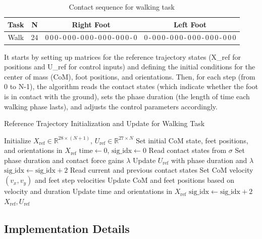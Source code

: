 \documentclass[main.tex]{subfiles}
\begin{document}
\begin{table}[H]
\centering
\caption{Contact sequence for walking task}
\label{tab:cs_walk}
\begin{tabular}{|c|c|c|c|}
\hline
\textbf{Task} & \textbf{N} & \textbf{Right Foot} & \textbf{Left Foot} \\
\hline
Walk & 24 & 0\,0\,0\,-\,0\,0\,0\,-\,0\,0\,0\,-\,0\,0\,0\,-\,0\,0\,0\,-\,0 & 0\,-\,0\,0\,0\,-\,0\,0\,0\,-\,0\,0\,0\,-\,0\,0\,0\,-\,0\,0\,0 \\
\hline
\end{tabular}
\end{table}

It starts by setting up matrices for the reference trajectory states (X\_ref for positions and U\_ref for control inputs) and defining the initial conditions for the center of mass (CoM), foot positions, and orientations. Then, for each step (from 0 to N-1), the algorithm reads the contact states (which indicate whether the foot is in contact with the ground), sets the phase duration (the length of time each walking phase lasts), and adjusts the control parameters accordingly.
\begin{algorithm}[H]
\caption{Reference Trajectory Initialization and Update for Walking Task}
\begin{algorithmic}[1]
\State Initialize $X_{\text{ref}} \in \mathbb{R}^{28 \times (N+1)}$, $U_{\text{ref}} \in \mathbb{R}^{27 \times N}$
\State Set initial CoM state, feet positions, and orientations in $X_{\text{ref}}$
\State $\text{time} \gets 0$, $\text{sig\_idx} \gets 0$
    \State Read contact states from $\sigma$
    \State Set phase duration and contact force gains $\lambda$
    \State Update $U_{\text{ref}}$ with phase duration and $\lambda$
    \State $\text{sig\_idx} \gets \text{sig\_idx} + 2$
\EndFor
{}
    \State Read current and previous contact states
    \State Set CoM velocity $(v_x, v_y)$ and feet step velocities
    \State Update CoM and feet positions based on velocity and duration
    \State Update time and orientations in $X_{\text{ref}}$
    \State $\text{sig\_idx} \gets \text{sig\_idx} + 2$
\EndFor
\State \Return $X_{\text{ref}}, U_{\text{ref}}$
\end{algorithmic}
\end{algorithm}

\subsection{Implementation Details}
\end{document}
